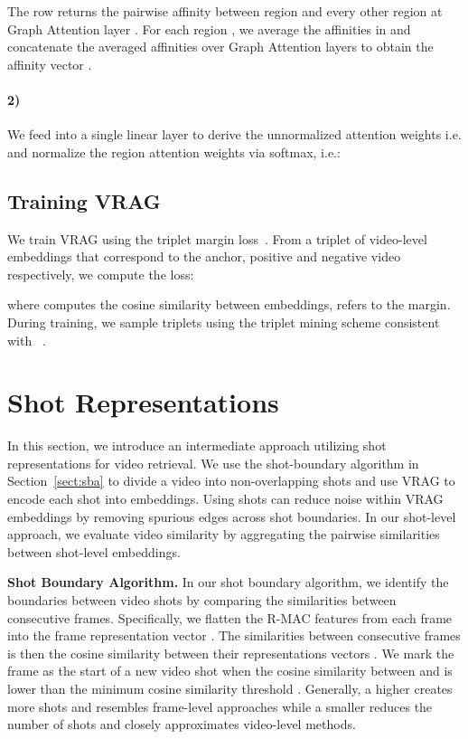 \documentclass[letterpaper]{article} \usepackage{aaai22}  \usepackage{times}  \usepackage{helvet}  \usepackage{courier}  \usepackage[hyphens]{url}  \usepackage{graphicx} \urlstyle{rm} \usepackage{amsmath}
\begin{document}
The row  returns the pairwise affinity between region  and every other region  at Graph Attention layer . For each region , we average the affinities in  and concatenate the averaged affinities over  Graph Attention layers to obtain the affinity vector . 

\vspace{-2mm}
\paragraph{2)} We feed  into a single linear layer to derive the unnormalized attention weights i.e.  and normalize the region attention weights 
via softmax, i.e.:


\subsection{Training VRAG}
We train VRAG using the triplet margin loss~\cite{triplet-margin-loss}. From a triplet of video-level embeddings  that correspond to the anchor, positive and negative video respectively, we compute the loss:

where  computes the cosine similarity between embeddings,  refers to the margin. During training, we sample triplets using the triplet mining scheme consistent with ~\cite{kordopatiszilos2019visil}.

\section{Shot Representations}

In this section, we introduce an intermediate approach utilizing shot representations for video retrieval. We use the shot-boundary algorithm in Section~\ref{sect:sba} to divide a video  into non-overlapping shots and use VRAG to encode each shot into embeddings. Using shots can reduce noise within VRAG embeddings by removing spurious edges across shot boundaries.
In our shot-level approach, we evaluate video similarity by aggregating the pairwise similarities between shot-level embeddings.

\textbf{\label{sect:sba}Shot Boundary Algorithm.} In our shot boundary algorithm, we identify the boundaries between video shots by comparing the similarities between consecutive frames. Specifically, we flatten the R-MAC features from each frame  into the frame representation vector . The similarities between consecutive frames is then the cosine similarity between their representations vectors . We mark the frame  as the start of a new video shot when the cosine similarity between  and  is lower than the minimum cosine similarity threshold . Generally, a higher  creates more shots and resembles frame-level approaches while a smaller  reduces the number of shots and closely approximates video-level methods.
\end{document}
